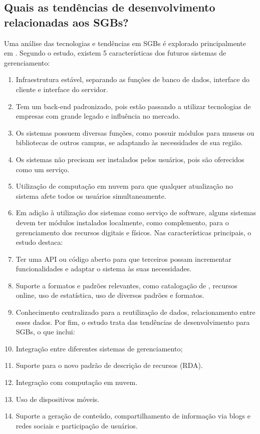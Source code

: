 \documentclass[12pt]{article}
\begin{document}
  \subsection{Quais as tendências de desenvolvimento relacionadas aos SGBs?}
  Uma análise das tecnologias e tendências em SGBs é explorado principalmente em \cite{7603363}. Segundo o estudo, existem 5 características dos futuros sistemas de gerenciamento:
  \begin{enumerate}
      \item Infraestrutura estável, separando as funções de banco de dados, interface do cliente e interface do servidor.
      \item Tem um back-end padronizado, pois estão passando a utilizar tecnologias de empresas com grande legado e influência no mercado.
      \item Os sistemas possuem diversas funções, como possuir módulos para museus ou bibliotecas de outros campus, se adaptando às necessidades de sua região.
      \item Os sistemas não precisam ser instalados pelos usuários, pois são oferecidos como um serviço.
      \item Utilização de computação em nuvem para  que qualquer atualização no sistema afete todos os usuários simultaneamente.
      \item Em adição à utilização dos sistemas como serviço de software, alguns sistemas devem ter módulos instalados localmente, como complemento, para o gerenciamento dos recursos digitais e físicos.
      \newline 
      \newline
Nas características principais, o estudo destaca:
      \item Ter uma API ou código aberto para que terceiros possam incrementar funcionalidades e adaptar o sistema às suas necessidades.
      \item Suporte a formatos e padrões relevantes, como catalogação de , recursos online, uso de estatística, uso de diversos padrões e formatos.
      \item Conhecimento centralizado para a reutilização de dados, relacionamento entre esses dados.
      \newline
      \newline
      Por fim, o estudo trata das tendências de desenvolvimento para SGBs, o que inclui:
\item Integração entre diferentes sistemas de gerenciamento;
\item Suporte para o novo padrão de descrição de recursos (RDA).
\item Integração com computação em nuvem.
\item Uso de dispositivos móveis.
\item Suporte a geração de conteúdo, compartilhamento de informação via blogs e redes sociais e participação de usuários.
  \end{enumerate}
\end{document}
